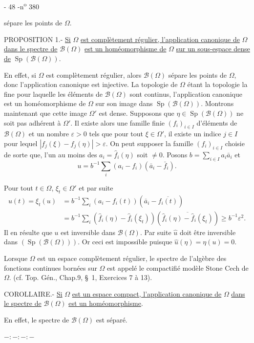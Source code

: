 - 48 -\hfill n\textsuperscript{o} 380

sépare les points de $\Omega$.

PROPOSITION 1.- \uline{Si} $\Omega$ \uline{est complètement régulier, l'application canonique de} $\Omega$ \uline{dans le spectre de} $\mathcal B(\Omega)$ \uline{est un homéomorphisme de} $\Omega$ \uline{sur un sous-espace dense de} $\operatorname{Sp}(\mathcal B(\Omega))$.

En effet, si $\Omega$ est complètement régulier, alors $\mathcal B(\Omega)$ sépare les points de $\Omega$, donc l'application canonique est injective. La topologie de $\Omega$ étant la topologie la \quad fine pour laquelle les éléments de $\mathcal B(\Omega)$ sont continus, l'application canonique est un homéomorphisme de $\Omega$ sur son image dans $\operatorname{Sp}(\mathcal B(\Omega))$. Montrons maintenant que cette image $\Omega'$ est dense. Supposons que $\eta\in\operatorname{Sp}(\mathcal B(\Omega))$ ne soit pas adhérent à $\Omega'$. Il existe alors une famille finie $(f_i)_{i\in I}$ d'éléments de $\mathcal B(\Omega)$ et un nombre $\varepsilon>0$ tels que pour tout $\xi\in\Omega'$, il existe un indice $j\in I$ pour lequel $|f_j(\xi)-f_j(\eta)|>\varepsilon$. On peut supposer la famille $(f_i)_{i\in I}$ choisie de sorte que, l'un au moins des $a_i=\widehat f_i(\eta)$ soit $\ne0$. Posons $b=\sum_{i\in I}a_i\bar a_i$ et
\[
u=b^{-1}\sum_i(a_i-f_i)(\bar a_i-\bar f_i).
\]

Pour tout $t\in\Omega$, $\xi_t\in\Omega'$ et par suite
\[
\begin{aligned}
u(t)=\xi_t(u)&=b^{-1}\sum_i(a_i-f_i(t))(\bar a_i-\overline{f_i(t)})\\
&=b^{-1}\sum_i(\widehat f_i(\eta)-\widehat f_i(\xi_t))(\overline{\widehat f_i(\eta)-\widehat f_i(\xi_t)})\geq b^{-1}\varepsilon^2.
\end{aligned}
\]
Il en résulte que $u$ est inversible dans $\mathcal B(\Omega)$. Par suite $\widehat u$ doit être inversible dans $(\operatorname{Sp}(\mathcal B(\Omega)))$. Or ceci est impossible puisque $\widehat u(\eta)=\eta(u)=0$.

Lorsque $\Omega$ est un espace complètement régulier, le spectre de l'algèbre des fonctions continues bornées sur $\Omega$ est appelé le compactifié modèle Stone Cech de $\Omega$.
(cf. Top. Gén., Chap.9, \S\ 1, Exercices 7 à 13).

COROLLAIRE.- \uline{Si} $\Omega$ \uline{est un espace compact, l'application canonique de} $\Omega$ \uline{dans le spectre de} $\mathcal B(\Omega)$ \uline{est un homéomorphisme}.

En effet, le spectre de $\mathcal B(\Omega)$ est séparé.

\(-:-:-:-\)
